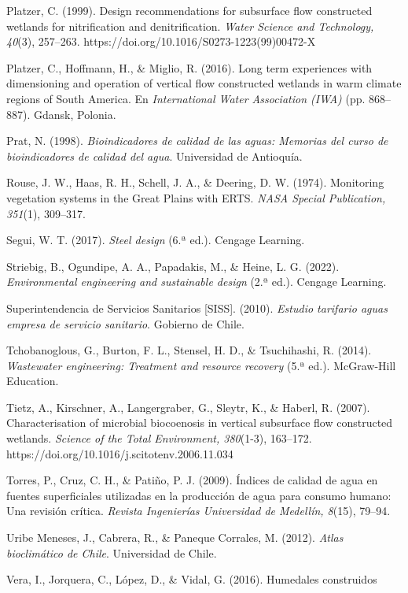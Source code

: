 \documentclass[12pt, letterpaper]{report}
\begin{document}
Platzer, C. (1999). Design recommendations for subsurface flow constructed wetlands for nitrification and denitrification. \textit{Water Science and Technology, 40}(3), 257--263. https://doi.org/10.1016/S0273-1223(99)00472-X

Platzer, C., Hoffmann, H., \& Miglio, R. (2016). Long term experiences with dimensioning and operation of vertical flow constructed wetlands in warm climate regions of South America. En \textit{International Water Association (IWA)} (pp. 868--887). Gdansk, Polonia.

Prat, N. (1998). \textit{Bioindicadores de calidad de las aguas: Memorias del curso de bioindicadores de calidad del agua}. Universidad de Antioquía.

Rouse, J. W., Haas, R. H., Schell, J. A., \& Deering, D. W. (1974). Monitoring vegetation systems in the Great Plains with ERTS. \textit{NASA Special Publication, 351}(1), 309--317.

Segui, W. T. (2017). \textit{Steel design} (6.ª ed.). Cengage Learning.

Striebig, B., Ogundipe, A. A., Papadakis, M., \& Heine, L. G. (2022). \textit{Environmental engineering and sustainable design} (2.ª ed.). Cengage Learning.

Superintendencia de Servicios Sanitarios [SISS]. (2010). \textit{Estudio tarifario aguas empresa de servicio sanitario}. Gobierno de Chile.

Tchobanoglous, G., Burton, F. L., Stensel, H. D., \& Tsuchihashi, R. (2014). \textit{Wastewater engineering: Treatment and resource recovery} (5.ª ed.). McGraw-Hill Education.

Tietz, A., Kirschner, A., Langergraber, G., Sleytr, K., \& Haberl, R. (2007). Characterisation of microbial biocoenosis in vertical subsurface flow constructed wetlands. \textit{Science of the Total Environment, 380}(1-3), 163--172. https://doi.org/10.1016/j.scitotenv.2006.11.034

Torres, P., Cruz, C. H., \& Patiño, P. J. (2009). Índices de calidad de agua en fuentes superficiales utilizadas en la producción de agua para consumo humano: Una revisión crítica. \textit{Revista Ingenierías Universidad de Medellín, 8}(15), 79--94.

Uribe Meneses, J., Cabrera, R., \& Paneque Corrales, M. (2012). \textit{Atlas bioclimático de Chile}. Universidad de Chile.

Vera, I., Jorquera, C., López, D., \& Vidal, G. (2016). Humedales construidos

\endgroup
\end{document}
